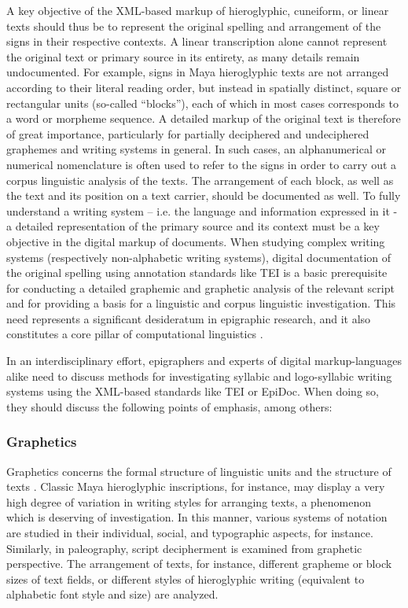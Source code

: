 \documentclass[amsthm,ebook]{saparticle}
\begin{document}
A key objective of the XML-based markup of hieroglyphic, cuneiform, or linear texts should thus be to represent the
original spelling and arrangement of the signs in their respective contexts. A linear transcription alone cannot
represent the original text or primary source in its entirety, as many details remain undocumented. For example, signs
in Maya hieroglyphic texts are not arranged according to their literal reading order, but instead in spatially
distinct, square or rectangular units (so-called ``blocks''), each of which in most cases corresponds to a word or
morpheme sequence. A detailed markup of the original text is therefore of great importance, particularly for partially
deciphered and undeciphered graphemes and writing systems in general. In such cases, an alphanumerical or numerical
nomenclature is often used to refer to the signs in order to carry out a corpus linguistic analysis of the texts. The
arrangement of each block, as well as the text and its position on a text carrier, should be documented as well. To
fully understand a writing system – i.e. the language and information expressed in it - a detailed representation of
the primary source and its context must be a key objective in the digital markup of documents. When studying complex
writing systems (respectively non-alphabetic writing systems), digital documentation of the original spelling using
annotation standards like TEI is a basic prerequisite for conducting a detailed graphemic and graphetic analysis of the
relevant script and for providing a basis for a linguistic and corpus linguistic investigation. This need represents a
significant desideratum in epigraphic research, and it also constitutes a core pillar of computational linguistics
\citep{McEneryWilson2001}. 

In an interdisciplinary effort, epigraphers and experts of digital markup-languages alike need to discuss methods for
investigating syllabic and logo-syllabic writing systems using the XML-based standards like TEI or EpiDoc. When doing
so, they should discuss the following points of emphasis, among others: 




\subsubsection[Graphetics ]{Graphetics }
Graphetics concerns the formal structure of linguistic units and the structure of texts \citep{Crystal1997}. Classic Maya
hieroglyphic inscriptions, for instance, may display a very high degree of variation in writing styles for arranging
texts, a phenomenon which is deserving of investigation. In this manner, various systems of notation are studied in
their individual, social, and typographic aspects, for instance.%
Similarly, in paleography, script
decipherment is examined from graphetic perspective. %
The arrangement of texts, for instance, different
grapheme or block sizes of text fields, or different styles of hieroglyphic writing (equivalent to alphabetic font
style and size) are analyzed. 
\end{document}
